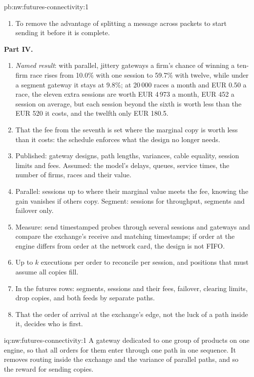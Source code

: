 \begin{solution}{pb:nw:futures-connectivity:1}
\begin{enumerate}[resume]
\item To remove the advantage of splitting a message across packets to start sending it before it is complete.
\end{enumerate}
\textbf{Part IV.}
\begin{enumerate}[resume]
\item \emph{Named result}: with parallel, jittery gateways a firm's chance of winning a ten-firm race rises from 10.0\% with one
  session to 59.7\% with twelve, while under a segment gateway it stays at 9.8\%; at 20\,000 races a month and EUR 0.50 a race, the
  eleven extra sessions are worth EUR 4\,973 a month, EUR 452 a session on average, but each session beyond the sixth is worth less
  than the EUR 520 it costs, and the twelfth only EUR 180.5.
\item That the fee from the seventh is set where the marginal copy is worth less than it costs: the schedule enforces what the
  design no longer needs.
\item Published: gateway designs, path lengths, variances, cable equality, session limits and fees. Assumed: the model's delays,
  queues, service times, the number of firms, races and their value.
\item Parallel: sessions up to where their marginal value meets the fee, knowing the gain vanishes if others copy. Segment: sessions
  for throughput, segments and failover only.
\item Measure: send timestamped probes through several sessions and gateways and compare the exchange's receive and matching
  timestamps; if order at the engine differs from order at the network card, the design is not FIFO.
\item Up to $k$ executions per order to reconcile per session, and positions that must assume all copies fill.
\item In the futures rows: segments, sessions and their fees, failover, clearing limits, drop copies, and both feeds by separate paths.
\item That the order of arrival at the exchange's edge, not the luck of a path inside it, decides who is first.
\end{enumerate}
\end{solution}

\begin{solution}{iq:nw:futures-connectivity:1}
A gateway dedicated to one group of products on one engine, so that all orders for them enter through one path in one sequence. It
removes routing inside the exchange and the variance of parallel paths, and so the reward for sending copies.
\end{solution}

